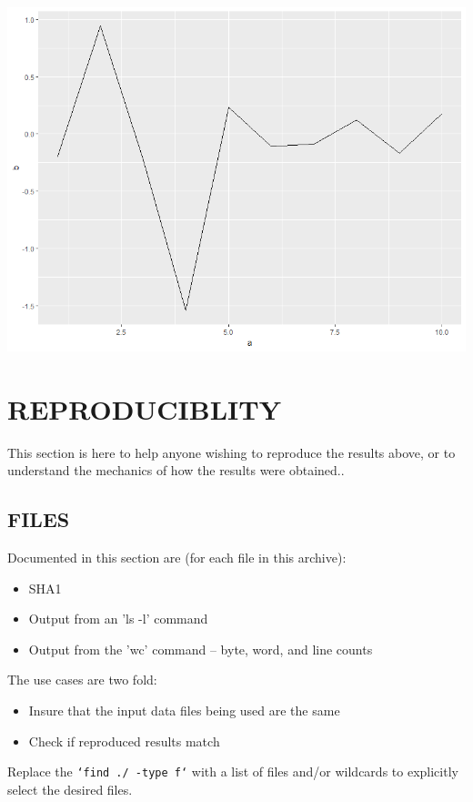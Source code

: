 \documentclass[11pt]{article}
\begin{document}
\includegraphics[width=.9\linewidth]{rOut1.png}

\section{REPRODUCIBLITY}
\label{sec-9}

This section is here to help anyone wishing to reproduce the results above, or to understand the mechanics of how the results were obtained..

\subsection{FILES}
\label{sec-9-1}

Documented in this section are (for each file in this archive):

\begin{itemize}
\item SHA1
\item Output from an 'ls -l' command
\item Output from the 'wc' command -- byte, word, and line counts
\end{itemize}

The use cases are two fold:

\begin{itemize}
\item Insure that the input data files being used are the same
\item Check if reproduced results match
\end{itemize}

Replace the \texttt{`find ./ -type f`} with a list of files and/or wildcards to explicitly select the desired files.
\end{document}
